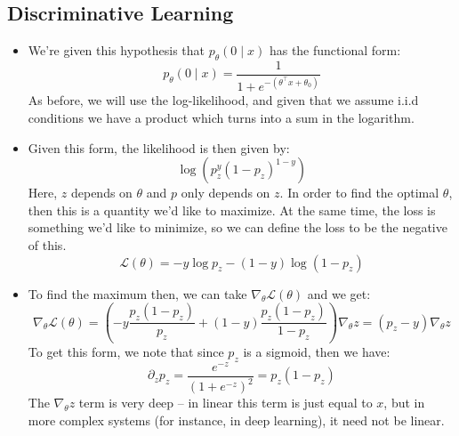 \subsection{Discriminative Learning}
\begin{itemize}
	\item We're given this hypothesis that \( p_{\theta}(0 \mid x) \) has the functional
		form:
		\[
			p_{\theta}(0 \mid x) = \frac{1}{1 + e^{-(\theta^{\top} x + \theta_0)}}
		\]
		As before, we will use the log-likelihood, and given that we assume i.i.d
		conditions we have a product which turns into a sum in the logarithm.   
	\item Given this form, the likelihood is then given by:
		\[
			\log\left( p_z^{y} (1 - p_z)^{1 - y} \right)
		\]
		Here, \( z \) depends on \( \theta \) and \( p \) only depends on \( z \). In
		order to find the optimal \( \theta \), then this is a quantity we'd like to
		maximize. At the same time, the loss is something we'd like to minimize, so
		we can define the loss to be the negative of this. 
		\[
			\mathcal{L}(\theta) = -y \log p_z - (1 - y)\log(1 - p_z)
		\]
	\item To find the maximum then, we can take \( \nabla_{\theta}\mathcal{L}(\theta)
		\) and we get:
		\begin{equation}
			\label{lec6}
			\nabla_{\theta}\mathcal{L}(\theta) = \left( -y \frac{p_z(1 - p_z)}{p_z} +
			(1 - y) \frac{p_z(1 - p_z)}{1 - p_z}\right)\nabla_{\theta}z = (p_z - y)
			\nabla_{\theta}z
		\end{equation}
		To get this form, we note that since \( p_z \) is a sigmoid, then we have:
		\[
			\partial_z p_z = \frac{e^{-z}}{(1 + e^{-z})^2} = p_z( 1 - p_z)
		\]
		The \( \nabla_{\theta}z \) term is very deep -- in linear this term is just
		equal to \( x \), but in more complex systems (for instance, in deep
		learning), it need not be linear. 
\end{itemize}

